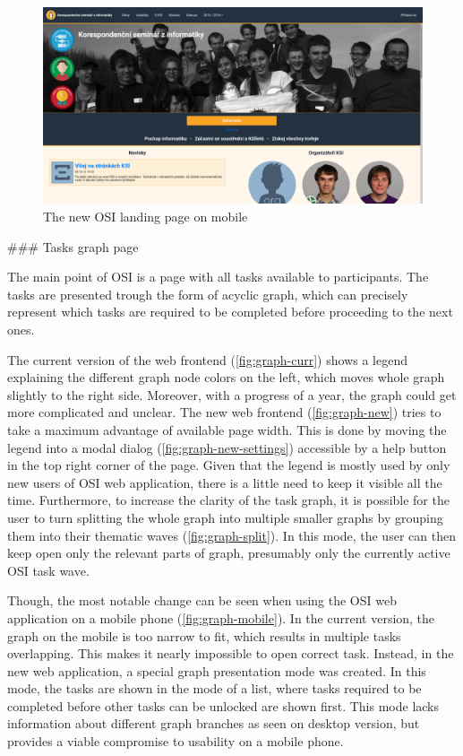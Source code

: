 \documentclass[
  digital, %
  oneside, %
  lof,     %
  lot,     %
]{fithesis4}
\begin{document}
{\begin{figure}
\includegraphics[width=\textwidth]{assets/img/welcome_new}
\caption{The new OSI landing page on mobile}
\label{fig:welcome-new}
\end{figure}

### Tasks graph page

The main point of OSI is a page with all tasks available to participants. The tasks are presented trough the form of acyclic graph, which can precisely represent which tasks are required to be completed before proceeding to the next ones.

The current version of the web frontend (\ref{fig:graph-curr}) shows a legend explaining the different graph node colors on the left, which moves whole graph slightly to the right side. Moreover, with a progress of a year, the graph could get more complicated and unclear. The new web frontend (\ref{fig:graph-new}) tries to take a maximum advantage of available page width. This is done by moving the legend into a modal dialog (\ref{fig:graph-new-settings}) accessible by a help button in the top right corner of the page. Given that the legend is mostly used by only new users of OSI web application, there is a little need to keep it visible all the time. Furthermore, to increase the clarity of the task graph, it is possible for the user to turn splitting the whole graph into multiple smaller graphs by grouping them into their thematic waves (\ref{fig:graph-split}). In this mode, the user can then keep open only the relevant parts of graph, presumably only the currently active OSI task wave.

Though, the most notable change can be seen when using the OSI web application on a mobile phone (\ref{fig:graph-mobile}). In the current version, the graph on the mobile is too narrow to fit, which results in multiple tasks overlapping. This makes it nearly impossible to open correct task. Instead, in the new web application, a special graph presentation mode was created. In this mode, the tasks are shown in the mode of a list, where tasks required to be completed before other tasks can be unlocked are shown first. This mode lacks information about different graph branches as seen on desktop version, but provides a viable compromise to usability on a mobile phone.

}
\end{document}
